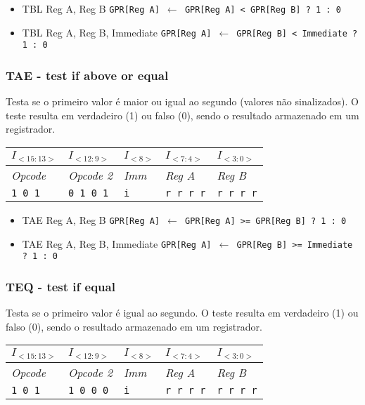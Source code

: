 \documentclass[11pt,a4paper]{report}
\begin{document}
\begin{itemize}
\item TBL Reg A, Reg B
\subitem \texttt{GPR[Reg A] $\leftarrow$ GPR[Reg A] < GPR[Reg B] ? 1 : 0}
\item TBL Reg A, Reg B, Immediate
\subitem \texttt{GPR[Reg A] $\leftarrow$ GPR[Reg B] < Immediate ? 1 : 0}
\end{itemize}

\subsubsection{TAE - test if above or equal}
Testa se o primeiro valor é maior ou igual ao segundo (valores não
sinalizados). O teste resulta em verdadeiro (1) ou falso (0), sendo o
resultado armazenado em um registrador.

\begin{table}[htb!]
\centering
\begin{tabular}{|p{2cm}|p{2cm}|p{2cm}|p{2cm}|p{2cm}|}
\hline
$I_{<15:13>}$ & $I_{<12:9>}$ & $I_{<8>}$ & $I_{<7:4>}$ & $I_{<3:0>}$  \\ \hline
\textit{Opcode} & \textit{Opcode 2} & \textit{Imm} & \textit{Reg A} & \textit{Reg B} \\ \hline
\texttt{1 0 1} & \texttt{0 1 0 1} & \texttt{i} & \texttt{r r r r} & \texttt{r r r r} \\ \hline
\end{tabular}
\end{table}

\begin{itemize}
\item TAE Reg A, Reg B
\subitem \texttt{GPR[Reg A] $\leftarrow$ GPR[Reg A] >= GPR[Reg B] ? 1 : 0}
\item TAE Reg A, Reg B, Immediate
\subitem \texttt{GPR[Reg A] $\leftarrow$ GPR[Reg B] >= Immediate ? 1 : 0}
\end{itemize}

\subsubsection{TEQ - test if equal}
Testa se o primeiro valor é igual ao segundo. O teste resulta em
verdadeiro (1) ou falso (0), sendo o resultado armazenado em um
registrador.

\begin{table}[htb!]
\centering
\begin{tabular}{|p{2cm}|p{2cm}|p{2cm}|p{2cm}|p{2cm}|}
\hline
$I_{<15:13>}$ & $I_{<12:9>}$ & $I_{<8>}$ & $I_{<7:4>}$ & $I_{<3:0>}$  \\ \hline
\textit{Opcode} & \textit{Opcode 2} & \textit{Imm} & \textit{Reg A} & \textit{Reg B} \\ \hline
\texttt{1 0 1} & \texttt{1 0 0 0} & \texttt{i} & \texttt{r r r r} & \texttt{r r r r} \\ \hline
\end{tabular}
\end{table}
\end{document}
